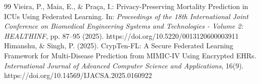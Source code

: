 \documentclass[pdflatex,sn-mathphys-num]{sn-jnl}
\begin{document}
\begin{thebibliography}{99}
Vieira, P., Maia, E., \& Praça, I.: Privacy-Preserving Mortality Prediction in ICUs Using Federated Learning. In: \textit{Proceedings of the 18th International Joint Conference on Biomedical Engineering Systems and Technologies - Volume 2: HEALTHINF}, pp. 87--95 (2025). https://doi.org/10.5220/0013120600003911
Himanshu, \& Singh, P. (2025). CrypTen-FL: A Secure Federated Learning Framework for Multi-Disease Prediction from MIMIC-IV Using Encrypted EHRs. \textit{International Journal of Advanced Computer Science and Applications}, 16(9). https://doi.org/10.14569/IJACSA.2025.0160922
\end{thebibliography}
\end{document}
